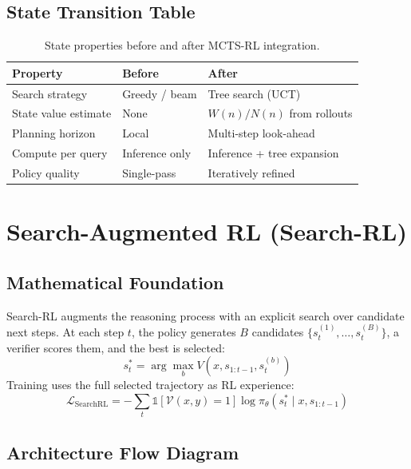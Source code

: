 \documentclass{article}
\begin{document}
\subsection{State Transition Table}
\begin{table}[h]\centering
\begin{tabular}{lll}\toprule
\textbf{Property} & \textbf{Before} & \textbf{After}\\\midrule
Search strategy & Greedy / beam & Tree search (UCT)\\
State value estimate & None & $W(n)/N(n)$ from rollouts\\
Planning horizon & Local & Multi-step look-ahead\\
Compute per query & Inference only & Inference + tree expansion\\
Policy quality & Single-pass & Iteratively refined\\\bottomrule
\end{tabular}
\caption{State properties before and after MCTS-RL integration.}
\end{table}

\newpage
\section{Search-Augmented RL (Search-RL)}

\subsection{Mathematical Foundation}
Search-RL augments the reasoning process with an explicit search over candidate next steps. At each step $t$, the policy generates $B$ candidates $\{s_t^{(1)},\ldots,s_t^{(B)}\}$, a verifier scores them, and the best is selected:
\begin{equation}
  s_t^* = \arg\max_{b} V(x, s_{1:t-1}, s_t^{(b)})
\end{equation}
Training uses the full selected trajectory as RL experience:
\begin{equation}
  \mathcal{L}_{\text{SearchRL}} = -\sum_t \mathbb{1}[\mathcal{V}(x,y) = 1]\log\pi_\theta(s_t^* \mid x, s_{1:t-1})
\end{equation}

\subsection{Architecture Flow Diagram}
\end{document}
